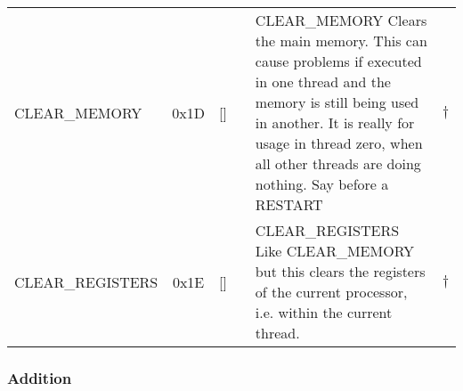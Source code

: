 \begin{longtable}{|l|c|p{1in}|c|p{2.27in}|c|}
  CLEAR\_MEMORY & 0x1D & [] &  & CLEAR\_MEMORY \newline
         Clears the main memory. This can cause problems if executed in one thread
         and the memory is still being used in another. It is really for usage in
         thread zero, when all other threads are doing nothing. Say before a RESTART & $\dagger$ \\
  CLEAR\_REGISTERS & 0x1E & [] &  & CLEAR\_REGISTERS \newline
         Like CLEAR\_MEMORY but this clears the registers of the current processor,
         i.e. within the current thread. & $\dagger$ \\
\hline
\end{longtable}
\subsubsection{Addition}
